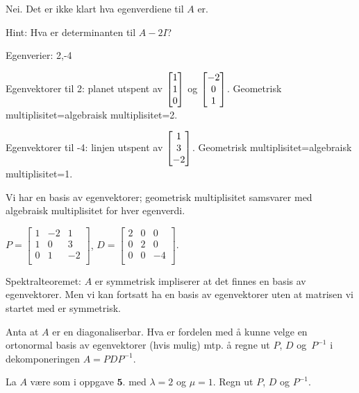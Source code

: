 \begin{losning}
\begin{punkt}
Nei. Det er ikke klart hva egenverdiene til $A$ er.
\end{punkt}

\begin{punkt}
Hint: Hva er determinanten til $A-2I$?
\end{punkt}

\begin{punkt}
Egenverier: 2,-4

\noindent
Egenvektorer til  2: planet utspent av $\begin{bmatrix} 1 \\ 1 \\ 0 \end{bmatrix}$ og $\begin{bmatrix} -2 \\ 0 \\ 1 \end{bmatrix}$. Geometrisk multiplisitet=algebraisk multiplisitet=2.

\noindent
Egenvektorer til  -4: linjen utspent av $\begin{bmatrix} 1 \\ 3 \\ -2 \end{bmatrix}$. Geometrisk multiplisitet=algebraisk multiplisitet=1.

\noindent
Vi har en basis av egenvektorer; geometrisk multiplisitet samsvarer med algebraisk multiplisitet for hver egenverdi.


\end{punkt}

\begin{punkt}
$P=\begin{bmatrix}
1 & -2 & 1\\
1 & 0 & 3\\
0 & 1 & -2\\
\end{bmatrix}$, $D=\begin{bmatrix}
2 & 0 & 0\\
0 & 2 & 0\\
0 & 0 & -4\\
\end{bmatrix}.$
\end{punkt}

\begin{punkt}
Spektralteoremet: $A$ er symmetrisk impliserer at det finnes en basis av egenvektorer. Men vi kan fortsatt ha en basis av egenvektorer uten at matrisen vi startet med er symmetrisk.
\end{punkt}

\end{losning}



\begin{oppgave}
\begin{punkt}
Anta at $A$ er en diagonaliserbar. Hva er fordelen med å kunne velge en ortonormal basis av egenvektorer (hvis mulig) mtp. å regne ut $P$, $D$ og~$P^{-1}$ i dekomponeringen $A=PDP^{-1}$.
\end{punkt}

\begin{punkt}
La $A$ være som i oppgave $\mathbf{5.}$ med $\lambda=2$ og $\mu=1$. Regn ut $P$, $D$ og $P^{-1}$.
\end{punkt}

\end{oppgave}


